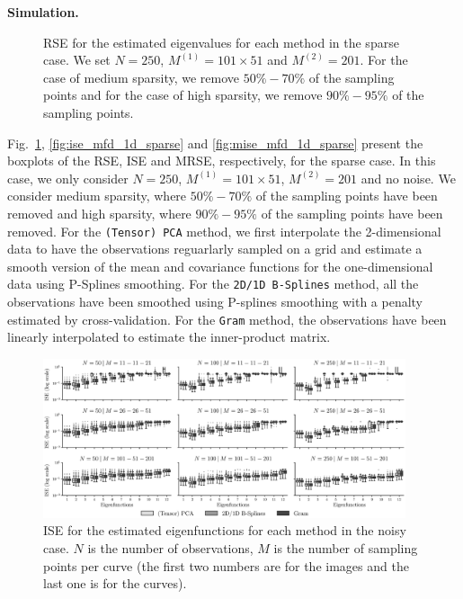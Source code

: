 \documentclass[times,sort&compress,3p]{elsarticle}
\theoremstyle{plain}%
\theoremstyle{definition}
\newenvironment{results}[1][]{\noindent \textbf{#1} \rmfamily}{\medskip}
\begin{document}
\begin{results}[Simulation.]
\begin{figure}
    \caption{RSE for the estimated eigenvalues for each method in the sparse case. We set $N = 250$, $M^{(1)} = 101 \times 51$ and $M^{(2)} = 201$. For the case of medium sparsity, we remove $50\%-70\%$ of the sampling points and for the case of high sparsity, we remove $90\%-95\%$ of the sampling points.}
    \label{fig:logAE_mfd_1d_sparse}
\end{figure}
Fig.~\ref{fig:logAE_mfd_1d_sparse}, \ref{fig:ise_mfd_1d_sparse} and \ref{fig:mise_mfd_1d_sparse} present the boxplots of the RSE, ISE and MRSE, respectively, for the sparse case. In this case, we only consider $N = 250$, $M^{(1)} = 101 \times 51$, $M^{(2)} = 201$ and no noise. We consider medium sparsity, where $50\%-70\%$ of the sampling points have been removed and high sparsity, where $90\%-95\%$ of the sampling points have been removed. For the \texttt{(Tensor) PCA} method, we first interpolate the 2-dimensional data to have the observations reguarlarly sampled on a grid and estimate a smooth version of the mean and covariance functions for the one-dimensional data using P-Splines smoothing. For the \texttt{2D/1D B-Splines} method, all the observations have been smoothed using P-splines smoothing with a penalty estimated by cross-validation. For the \texttt{Gram} method, the observations have been linearly interpolated to estimate the inner-product matrix.


\begin{figure}
     \centering
    \includegraphics[width=0.95\textwidth]{ISE_noise}
    \caption{ISE for the estimated eigenfunctions for each method in the noisy case. $N$ is the number of observations, $M$ is the number of sampling points per curve (the first two numbers are for the images and the last one is for the curves).}
    \label{fig:ise_mfd_1d_noise}
\end{figure}


\end{results}
\end{document}
